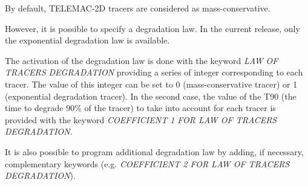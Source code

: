  By default, TELEMAC-2D tracers are considered as mass-conservative.

 However, it is possible to specify a degradation law. In the current release, only the exponential degradation law is available.

 The activation of the degradation law is done with the keyword \textit{LAW OF TRACERS DEGRADATION} providing a series of integer corresponding to each tracer. The value of this integer can be set to 0 (mass-conservative tracer) or 1 (exponential degradation tracer). In the second case, the value of the T90 (the time to degrade 90\% of the tracer) to take into account for each tracer is provided with the keyword \textit{COEFFICIENT 1 FOR LAW OF TRACERS DEGRADATION.}

 It is also possible to program additional degradation law by adding, if necessary, complementary keywords (e.g. \textit{COEFFICIENT 2 FOR LAW OF TRACERS DEGRADATION}).

